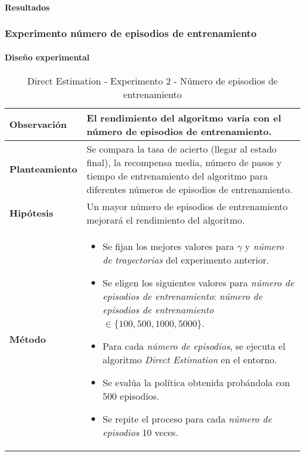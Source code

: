 \paragraph{Resultados}

\subsubsection{Experimento número de episodios de entrenamiento}

\paragraph{Diseño experimental}

\begin{table}[H]
    \centering
    \begin{tabularx}{\textwidth}{|p{4cm}|X|} %
        \hline %
        \textbf{Observación} & El rendimiento del algoritmo varía con el número de episodios de entrenamiento.
        \\ \hline
        \textbf{Planteamiento} & Se compara la tasa de acierto (llegar al estado final), la recompensa media, número de pasos y tiempo de entrenamiento del algoritmo para diferentes números de episodios de entrenamiento.
        \\ \hline
        \textbf{Hipótesis} & Un mayor número de episodios de entrenamiento mejorará el rendimiento del algoritmo.
        \\ \hline
        \textbf{Método} & 
        \begin{itemize}
            \item Se fijan los mejores valores para \(\gamma\) y \textit{número de trayectorias} del experimento anterior.
            \item Se eligen los siguientes valores para \textit{número de episodios de entrenamiento}: \textit{número de episodios de entrenamiento} \(\in \{100, 500, 1000, 5000\}\).
            \item Para cada \textit{número de episodios}, se ejecuta el algoritmo \textit{Direct Estimation} en el entorno.
            \item Se evalúa la política obtenida probándola con 500 episodios.
            \item Se repite el proceso para cada \textit{número de episodios} 10 veces.
        \end{itemize}
        \\ \hline
    \end{tabularx}
    \caption{Direct Estimation - Experimento 2 - Número de episodios de entrenamiento}
    \label{tab:diseñoDirectEstimationExp2}
\end{table}

